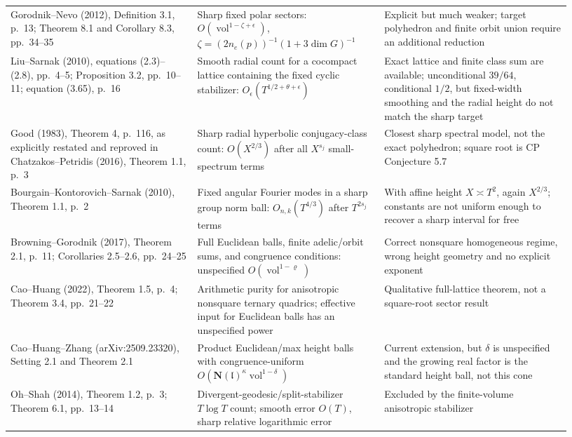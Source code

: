 \begin{longtable}[]{@{}
  >{\raggedright\arraybackslash}p{0.31\linewidth}
  >{\raggedright\arraybackslash}p{0.31\linewidth}
  >{\raggedright\arraybackslash}p{0.31\linewidth}@{}}
Gorodnik--Nevo (2012), Definition 3.1, p.~13; Theorem 8.1 and Corollary 8.3, pp.~34--35 & Sharp fixed polar sectors: \(O(\operatorname{vol}^{1-\zeta+\epsilon})\), \(\zeta=(2n_e(p))^{-1}(1+3\dim G)^{-1}\) & Explicit but much weaker; target polyhedron and finite orbit union require an additional reduction \\
Liu--Sarnak (2010), equations (2.3)--(2.8), pp.~4--5; Proposition 3.2, pp.~10--11; equation (3.65), p.~16 & Smooth radial count for a cocompact lattice containing the fixed cyclic stabilizer: \(O_\epsilon(T^{1/2+\theta+\epsilon})\) & Exact lattice and finite class sum are available; unconditional \(39/64\), conditional \(1/2\), but fixed-width smoothing and the radial height do not match the sharp target \\
Good (1983), Theorem 4, p.~116, as explicitly restated and reproved in Chatzakos--Petridis (2016), Theorem 1.1, p.~3 & Sharp radial hyperbolic conjugacy-class count: \(O(X^{2/3})\) after all \(X^{s_j}\) small-spectrum terms & Closest sharp spectral model, not the exact polyhedron; square root is CP Conjecture 5.7 \\
Bourgain--Kontorovich--Sarnak (2010), Theorem 1.1, p.~2 & Fixed angular Fourier modes in a sharp group norm ball: \(O_{n,k}(T^{4/3})\) after \(T^{2s_j}\) terms & With affine height \(X\asymp T^2\), again \(X^{2/3}\); constants are not uniform enough to recover a sharp interval for free \\
Browning--Gorodnik (2017), Theorem 2.1, p.~11; Corollaries 2.5--2.6, pp.~24--25 & Full Euclidean balls, finite adelic/orbit sums, and congruence conditions: unspecified \(O(\operatorname{vol}^{1-\varrho})\) & Correct nonsquare homogeneous regime, wrong height geometry and no explicit exponent \\
Cao--Huang (2022), Theorem 1.5, p.~4; Theorem 3.4, pp.~21--22 & Arithmetic purity for anisotropic nonsquare ternary quadrics; effective input for Euclidean balls has an unspecified power & Qualitative full-lattice theorem, not a square-root sector result \\
Cao--Huang--Zhang (arXiv:2509.23320), Setting 2.1 and Theorem 2.1 & Product Euclidean/max height balls with congruence-uniform \(O(\mathbf N(\mathfrak l)^\kappa\operatorname{vol}^{1-\delta})\) & Current extension, but \(\delta\) is unspecified and the growing real factor is the standard height ball, not this cone \\
Oh--Shah (2014), Theorem 1.2, p.~3; Theorem 6.1, pp.~13--14 & Divergent-geodesic/split-stabilizer \(T\log T\) count; smooth error \(O(T)\), sharp relative logarithmic error & Excluded by the finite-volume anisotropic stabilizer \\

\end{longtable}
